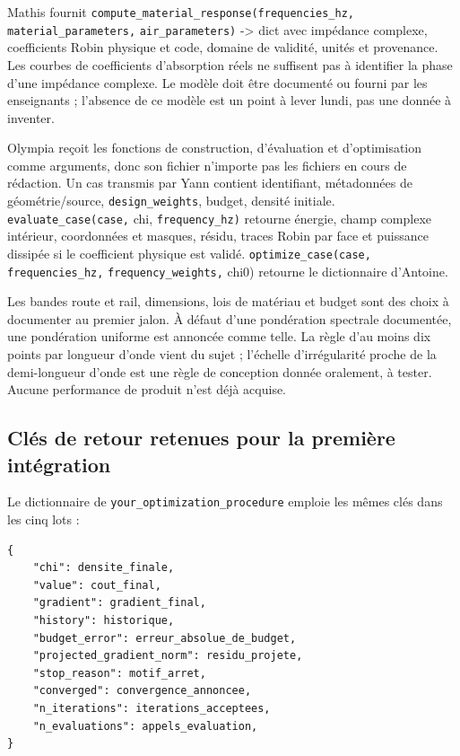 \documentclass[11pt,a4paper]{article}
\begin{document}
Mathis fournit {\small\ttfamily \nolinkurl{compute_material_response(frequencies_hz,} \nolinkurl{material_parameters,} \nolinkurl{air_parameters)} -> dict} avec impédance complexe, coefficients Robin physique et code, domaine de validité, unités et provenance. Les courbes de coefficients d'absorption réels ne suffisent pas à identifier la phase d'une impédance complexe. Le modèle doit être documenté ou fourni par les enseignants ; l'absence de ce modèle est un point à lever lundi, pas une donnée à inventer.

Olympia reçoit les fonctions de construction, d'évaluation et d'optimisation comme arguments, donc son fichier n'importe pas les fichiers en cours de rédaction. Un cas transmis par Yann contient identifiant, métadonnées de géométrie/source, {\small\ttfamily \nolinkurl{design_weights}}, budget, densité initiale. {\small\ttfamily \nolinkurl{evaluate_case(case,} chi, \nolinkurl{frequency_hz)}} retourne énergie, champ complexe intérieur, coordonnées et masques, résidu, traces Robin par face et puissance dissipée si le coefficient physique est validé. {\small\ttfamily \nolinkurl{optimize_case(case,} \nolinkurl{frequencies_hz,} \nolinkurl{frequency_weights,} chi0)} retourne le dictionnaire d'Antoine.

Les bandes route et rail, dimensions, lois de matériau et budget sont des choix à documenter au premier jalon. À défaut d'une pondération spectrale documentée, une pondération uniforme est annoncée comme telle. La règle d'au moins dix points par longueur d'onde vient du sujet ; l'échelle d'irrégularité proche de la demi-longueur d'onde est une règle de conception donnée oralement, à tester. Aucune performance de produit n'est déjà acquise.

\subsection{Clés de retour retenues pour la première intégration}

Le dictionnaire de {\small\ttfamily \nolinkurl{your_optimization_procedure}} emploie les mêmes clés dans les cinq lots :

\begin{Verbatim}[breaklines,breakanywhere,fontsize=\footnotesize]
{
    "chi": densite_finale,
    "value": cout_final,
    "gradient": gradient_final,
    "history": historique,
    "budget_error": erreur_absolue_de_budget,
    "projected_gradient_norm": residu_projete,
    "stop_reason": motif_arret,
    "converged": convergence_annoncee,
    "n_iterations": iterations_acceptees,
    "n_evaluations": appels_evaluation,
}
\end{Verbatim}
\end{document}
